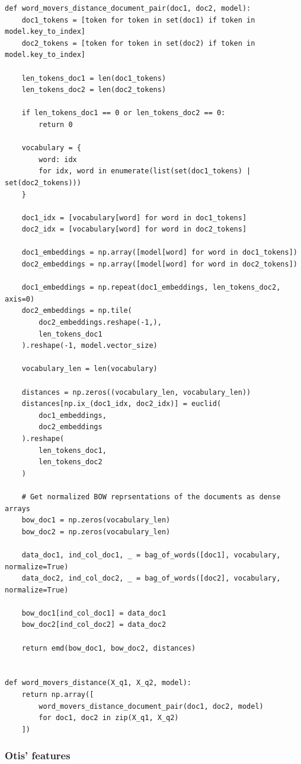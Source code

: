 \documentclass[11pt,a4paper]{article}
\begin{document}
\begin{lstlisting}
def word_movers_distance_document_pair(doc1, doc2, model):
    doc1_tokens = [token for token in set(doc1) if token in model.key_to_index]
    doc2_tokens = [token for token in set(doc2) if token in model.key_to_index]

    len_tokens_doc1 = len(doc1_tokens)
    len_tokens_doc2 = len(doc2_tokens)

    if len_tokens_doc1 == 0 or len_tokens_doc2 == 0:
        return 0

    vocabulary = {
        word: idx
        for idx, word in enumerate(list(set(doc1_tokens) | set(doc2_tokens)))
    }

    doc1_idx = [vocabulary[word] for word in doc1_tokens]
    doc2_idx = [vocabulary[word] for word in doc2_tokens]

    doc1_embeddings = np.array([model[word] for word in doc1_tokens])
    doc2_embeddings = np.array([model[word] for word in doc2_tokens])

    doc1_embeddings = np.repeat(doc1_embeddings, len_tokens_doc2, axis=0)
    doc2_embeddings = np.tile(
        doc2_embeddings.reshape(-1,),
        len_tokens_doc1
    ).reshape(-1, model.vector_size)

    vocabulary_len = len(vocabulary)

    distances = np.zeros((vocabulary_len, vocabulary_len))
    distances[np.ix_(doc1_idx, doc2_idx)] = euclid(
        doc1_embeddings,
        doc2_embeddings
    ).reshape(
        len_tokens_doc1,
        len_tokens_doc2
    )

    # Get normalized BOW reprsentations of the documents as dense arrays
    bow_doc1 = np.zeros(vocabulary_len)
    bow_doc2 = np.zeros(vocabulary_len)

    data_doc1, ind_col_doc1, _ = bag_of_words([doc1], vocabulary, normalize=True)
    data_doc2, ind_col_doc2, _ = bag_of_words([doc2], vocabulary, normalize=True)

    bow_doc1[ind_col_doc1] = data_doc1
    bow_doc2[ind_col_doc2] = data_doc2

    return emd(bow_doc1, bow_doc2, distances)


def word_movers_distance(X_q1, X_q2, model):
    return np.array([
        word_movers_distance_document_pair(doc1, doc2, model)
        for doc1, doc2 in zip(X_q1, X_q2)
    ])
\end{lstlisting}

\subsubsection{Otis' features}
\end{document}

